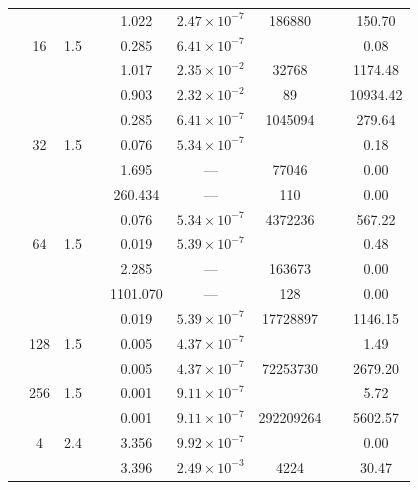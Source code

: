 \begin{table}[htbp]
\begin{tabular}{l S[table-format=3.0] S[table-format=4.1] l S[table-format=3.3] S[table-format=1.2e2] S[table-format=6.0] S[table-format=2.0] S[table-format=4.2]}
     &  &  &  & 1.022 & $2.47 \times 10^{-7}$ & 186880 & {\text{---}} & 150.70 \\
     & 16 & 1.5 &  & 0.285 & $6.41 \times 10^{-7}$ & {\text{---}} & {\text{---}} & 0.08 \\
     &  &  &  & 1.017 & $2.35 \times 10^{-2}$ & 32768 & {\text{---}} & 1174.48 \\
     &  &  &  & 0.903 & $2.32 \times 10^{-2}$ & 89 & {\text{---}} & 10934.42 \\
     &  &  &  & 0.285 & $6.41 \times 10^{-7}$ & 1045094 & {\text{---}} & 279.64 \\
     & 32 & 1.5 &  & 0.076 & $5.34 \times 10^{-7}$ & {\text{---}} & {\text{---}} & 0.18 \\
     &  &  &  & 1.695 & ${\text{---}}$ & 77046 & {\text{---}} & 0.00 \\
     &  &  &  & 260.434 & ${\text{---}}$ & 110 & {\text{---}} & 0.00 \\
     &  &  &  & 0.076 & $5.34 \times 10^{-7}$ & 4372236 & {\text{---}} & 567.22 \\
     & 64 & 1.5 &  & 0.019 & $5.39 \times 10^{-7}$ & {\text{---}} & {\text{---}} & 0.48 \\
     &  &  &  & 2.285 & ${\text{---}}$ & 163673 & {\text{---}} & 0.00 \\
     &  &  &  & 1101.070 & ${\text{---}}$ & 128 & {\text{---}} & 0.00 \\
     &  &  &  & 0.019 & $5.39 \times 10^{-7}$ & 17728897 & {\text{---}} & 1146.15 \\
     & 128 & 1.5 &  & 0.005 & $4.37 \times 10^{-7}$ & {\text{---}} & {\text{---}} & 1.49 \\
     &  &  &  & 0.005 & $4.37 \times 10^{-7}$ & 72253730 & {\text{---}} & 2679.20 \\
     & 256 & 1.5 &  & 0.001 & $9.11 \times 10^{-7}$ & {\text{---}} & {\text{---}} & 5.72 \\
     &  &  &  & 0.001 & $9.11 \times 10^{-7}$ & 292209264 & {\text{---}} & 5602.57 \\
    \midrule
     & 4 & 2.4 &  & 3.356 & $9.92 \times 10^{-7}$ & {\text{---}} & {\text{---}} & 0.00 \\
     &  &  &  & 3.396 & $2.49 \times 10^{-3}$ & 4224 & {\text{---}} & 30.47 \\

\end{tabular}
\end{table}
